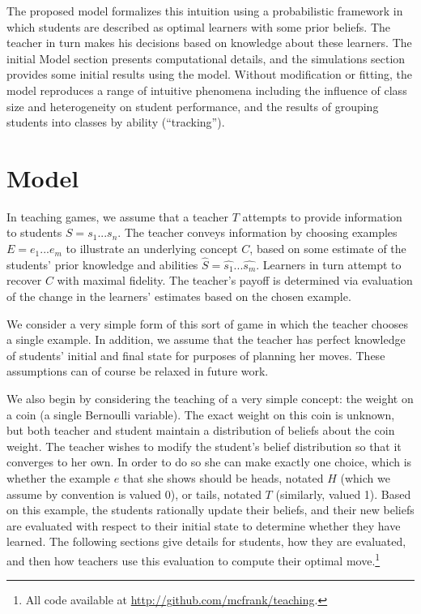 \documentclass[10pt,letterpaper]{article}
\begin{document}
The proposed model formalizes this intuition using a probabilistic framework in which students are described as optimal learners with some prior beliefs.  The teacher in turn makes his decisions based on knowledge about these learners. The initial Model section presents computational details, and the simulations section provides some initial results using the model. Without modification or fitting, the model reproduces a range of intuitive phenomena including the influence of class size and heterogeneity on student performance, and the results of grouping students into classes by ability (``tracking''). 

\section{Model}

In teaching games, we assume that a teacher $T$ attempts to provide information to students $S = {s_1 ... s_n}$. The teacher conveys information by choosing examples $E = {e_1 ... e_m}$ to illustrate an underlying concept $C$, based on some estimate of the students' prior knowledge and abilities $\hat{S} = {\hat{s_1} ... \hat{s_m}}$. Learners in turn attempt to recover $C$ with maximal fidelity. The teacher's payoff is determined via evaluation of the change in the learners' estimates based on the chosen example.

We consider a very simple form of this sort of game in which the teacher chooses a single example. In addition, we assume that the teacher has perfect knowledge of students' initial and final state for purposes of planning her moves. These assumptions can of course be relaxed in future work.

We also begin by considering the teaching of a very simple concept: the weight on a coin (a single Bernoulli variable). The exact weight on this coin is unknown, but both teacher and student maintain a distribution of beliefs about the coin weight. The teacher wishes to modify the student's belief distribution so that it converges to her own. In order to do so she can make exactly one choice, which is whether the example $e$ that she shows should be heads, notated $H$ (which we assume by convention is valued 0), or tails, notated $T$ (similarly, valued 1). Based on this example, the students rationally update their beliefs, and their new beliefs are evaluated with respect to their initial state to determine whether they have learned. The following sections give details for students, how they are evaluated, and then how teachers use this evaluation to compute their optimal move.\footnote{All code available at \url{http://github.com/mcfrank/teaching}.}
\end{document}
